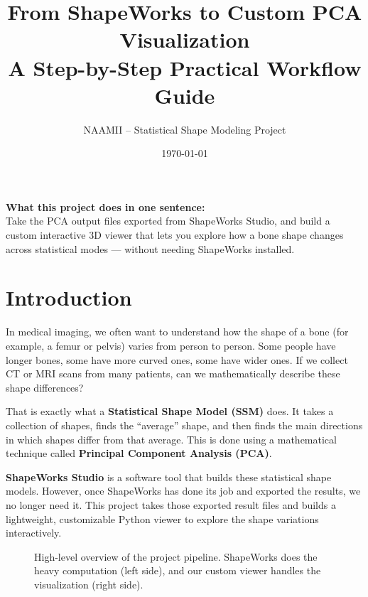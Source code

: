\documentclass[12pt,a4paper]{article}
\title{\textbf{From ShapeWorks to Custom PCA Visualization} \\[0.5em]
\large A Step-by-Step Practical Workflow Guide}
\author{NAAMII -- Statistical Shape Modeling Project}
\date{\today}
\begin{document}
\maketitle

\begin{mdframed}[backgroundcolor=codegray, linecolor=shapeworksblue, linewidth=1.5pt]
\textbf{What this project does in one sentence:} \\[0.3em]
Take the PCA output files exported from ShapeWorks Studio, and build a custom interactive 3D viewer that lets you explore how a bone shape changes across statistical modes --- without needing ShapeWorks installed.
\end{mdframed}

\tableofcontents
\newpage

\section{Introduction}

In medical imaging, we often want to understand how the shape of a bone (for example, a femur or pelvis) varies from person to person. Some people have longer bones, some have more curved ones, some have wider ones. If we collect CT or MRI scans from many patients, can we mathematically describe these shape differences?

That is exactly what a \textbf{Statistical Shape Model (SSM)} does. It takes a collection of shapes, finds the ``average'' shape, and then finds the main directions in which shapes differ from that average. This is done using a mathematical technique called \textbf{Principal Component Analysis (PCA)}.

\textbf{ShapeWorks Studio} is a software tool that builds these statistical shape models. However, once ShapeWorks has done its job and exported the results, we no longer need it. This project takes those exported result files and builds a lightweight, customizable Python viewer to explore the shape variations interactively.

\begin{figure}[H]
    \centering
    \caption{High-level overview of the project pipeline. ShapeWorks does the heavy computation (left side), and our custom viewer handles the visualization (right side).}
    \label{fig:overview}
\end{figure}
\end{document}
